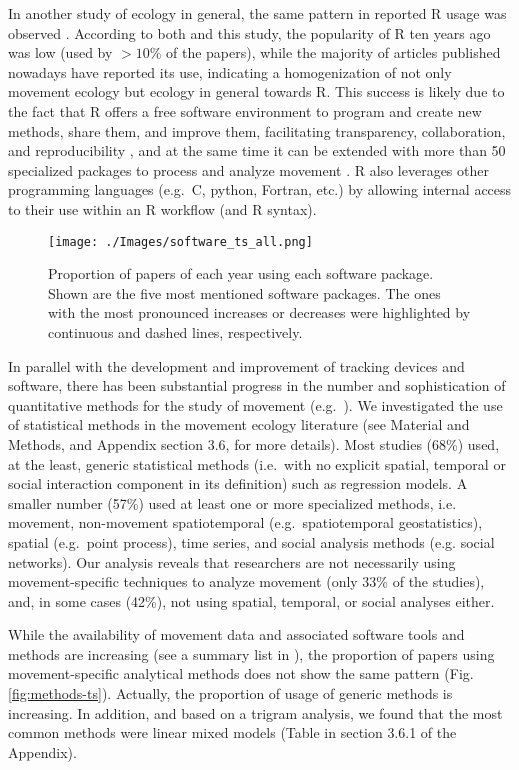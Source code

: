 \documentclass[a4paper,12pt]{article}
\begin{document}
In another study of ecology in general, the same pattern in reported R
usage was observed \cite{Lai2019}. According to both \cite{Lai2019} and this study, the
popularity of R ten years ago was low (used by \(> 10\%\) of the
papers), while the majority of articles published nowadays have reported
its use, indicating a homogenization of not only movement ecology but
ecology in general towards R. This success is likely due to the fact
that R offers a free software environment to program and create new
methods, share them, and improve them, facilitating transparency,
collaboration, and reproducibility \cite{Lowndes2017}, and at the same time it can be
extended with more than 50 specialized packages to process and analyze
movement \cite{Joo2020}. R also leverages other programming languages (e.g.~C,
python, Fortran, etc.) by allowing internal access to their use within
an R workflow (and R syntax).

\begin{figure}
	\texttt{[image: ./Images/software\_ts\_all.png]}
	\caption{Proportion of papers of each year using each software package. Shown are the five most mentioned software packages. The ones with the most pronounced increases or decreases were highlighted by continuous and dashed lines, respectively.}
	\label{fig:software-ts}
\end{figure}

In parallel with the development and improvement of tracking devices and
software, there has been substantial progress in the number and
sophistication of quantitative methods for the study of movement
(e.g.~\cite{Avgar2016,Seidel2018,Auger-methe2020}). We investigated the use of statistical methods
in the movement ecology literature (see Material and Methods, and
Appendix section 3.6, for more details). Most studies (68\%) used, at
the least, generic statistical methods (i.e.~with no explicit spatial,
temporal or social interaction component in its definition) such as
regression models. A smaller number (57\%) used at least one or more
specialized methods, i.e. movement, non-movement spatiotemporal
(e.g.~spatiotemporal geostatistics), spatial (e.g.~point process), time
series, and social analysis methods (e.g. social networks). Our analysis
reveals that researchers are not necessarily using movement-specific
techniques to analyze movement (only 33\% of the studies), and, in some
cases (42\%), not using spatial, temporal, or social analyses either.

While the availability of movement data and associated software tools
and methods are increasing (see a summary list in \cite{Borger2016}), the proportion
of papers using movement-specific analytical methods does not show the
same pattern (Fig. \ref{fig:methods-ts}). Actually, the proportion of
usage of generic methods is increasing. In addition, and based on a
trigram analysis, we found that the most common methods were linear
mixed models (Table in section 3.6.1 of the Appendix).
\end{document}
